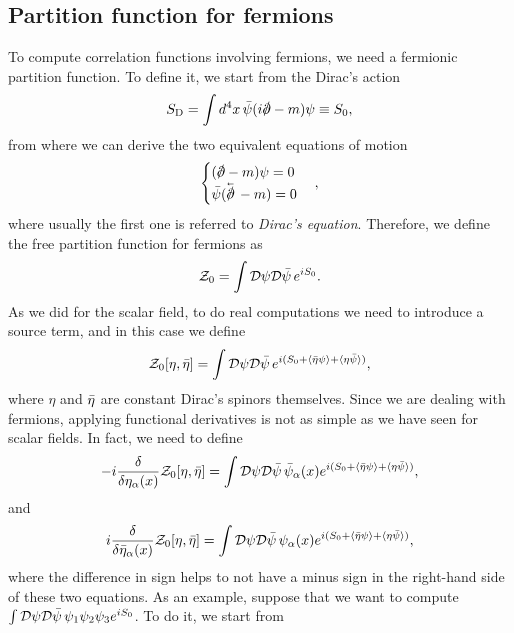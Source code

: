 \subsection{Partition function for fermions}
To compute correlation functions involving fermions, we need a fermionic partition function. To define it, we start from the Dirac's action 
\begin{equation}
\label{eq: Dirac's action}
    S_\rem{D} = \int d^4x\,\b{\psi}(i\sl{\p} - m)\psi \equiv S_0,
\end{equation}
from where we can derive the two equivalent equations of motion 
\begin{equation}
    \begin{cases}
        (\sl{\p} - m)\psi = 0 \\
        \b{\psi}(\backv{\sl{\p}} - m) = 0
    \end{cases},
\end{equation}
where usually the first one is referred to \emph{Dirac's equation}. Therefore, we define the free partition function for fermions as 
\begin{equation}
\label{eq: free partition function for fermions}
    \mathcal{Z}_0 = \int \mathcal{D}\psi\mathcal{D}\bar{\psi}\,e^{iS_0}.
\end{equation}
As we did for the scalar field, to do real computations we need to introduce a source term, and in this case we define 
\begin{equation}
\label{eq: free partition function for fermions (with source term)}
    \mathcal{Z}_0[\eta,\bar{\eta}] = \int\mathcal{D}\psi\mathcal{D}\bar{\psi}\,e^{i(S_0 + \langle \bar{\eta}\psi \rangle + \langle \eta\bar{\psi} \rangle)},
\end{equation}
where $\eta$ and $\bar{\eta}$ are constant Dirac's spinors themselves. Since we are dealing with fermions, applying functional derivatives is not as simple as we have seen for scalar fields. In fact, we need to define 
\begin{equation}
    -i\frac{\delta}{\delta\eta_\alpha(x)}\mathcal{Z}_0[\eta,\bar{\eta}] = \int \mathcal{D}\psi\mathcal{D}\bar{\psi}\,\bar{\psi}_\alpha(x)e^{i(S_0 + \langle \bar{\eta}\psi \rangle + \langle \eta\bar{\psi} \rangle)},
\end{equation}
and 
\begin{equation}
    i\frac{\delta}{\delta\bar{\eta}_\alpha(x)}\mathcal{Z}_0[\eta,\bar{\eta}] = \int \mathcal{D}\psi\mathcal{D}\bar{\psi}\,\psi_\alpha(x)e^{i(S_0 + \langle \bar{\eta}\psi \rangle + \langle \eta\bar{\psi} \rangle)},
\end{equation}
where the difference in sign helps to not have a minus sign in the right-hand side of these two equations. As an example, suppose that we want to compute $\int \mathcal{D}\psi\mathcal{D}\bar{\psi}\,\psi_1\psi_2\psi_3 e^{iS_0}$. To do it, we start from 

